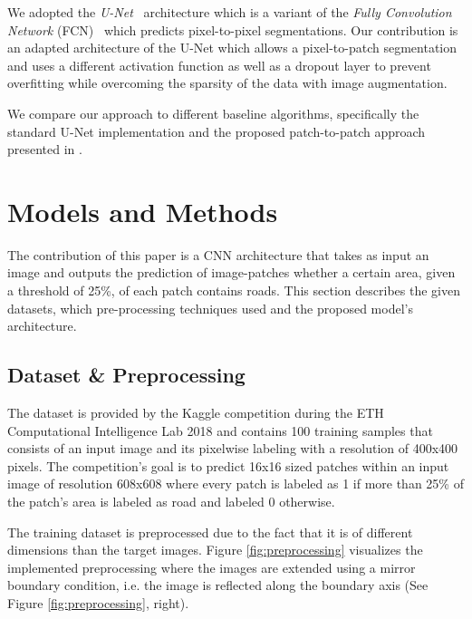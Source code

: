 \documentclass[10pt,conference,compsocconf]{IEEEtran}
\begin{document}
We adopted the \textit{U-Net}~\cite{Ronneberger2015} architecture which is a variant of the \textit{Fully Convolution Network} (FCN)~\cite{Long2014} which predicts pixel-to-pixel segmentations. Our contribution is an adapted architecture of the U-Net which allows a pixel-to-patch segmentation and uses a different activation function as well as a dropout layer to prevent overfitting while overcoming the sparsity of the data with image augmentation.

We compare our approach to different baseline algorithms, specifically the standard U-Net implementation and the proposed patch-to-patch approach presented in \cite{Pavllo2017}.

\section{Models and Methods}

The contribution of this paper is a CNN architecture that takes as input an image and outputs the prediction of image-patches whether a certain area, given a threshold of 25\%, of each patch contains roads. This section describes the given datasets, which pre-processing techniques used and the proposed model’s architecture.

\subsection{Dataset \& Preprocessing}

The dataset is provided by the Kaggle competition during the ETH Computational Intelligence Lab 2018 \cite{KaggleCompetition} and contains 100 training samples that consists of an input image and its pixelwise labeling with a resolution of 400x400 pixels. The competition’s goal is to predict 16x16 sized patches within an input image of resolution 608x608 where every patch is labeled as 1 if more than 25\% of the patch’s area is labeled as road and labeled 0 otherwise.

The training dataset is preprocessed due to the fact that it is of different dimensions than the target images. Figure \ref{fig:preprocessing} visualizes the implemented preprocessing where the images are extended using a mirror boundary condition, i.e. the image is reflected along the boundary axis (See Figure \ref{fig:preprocessing}, right).
\end{document}
